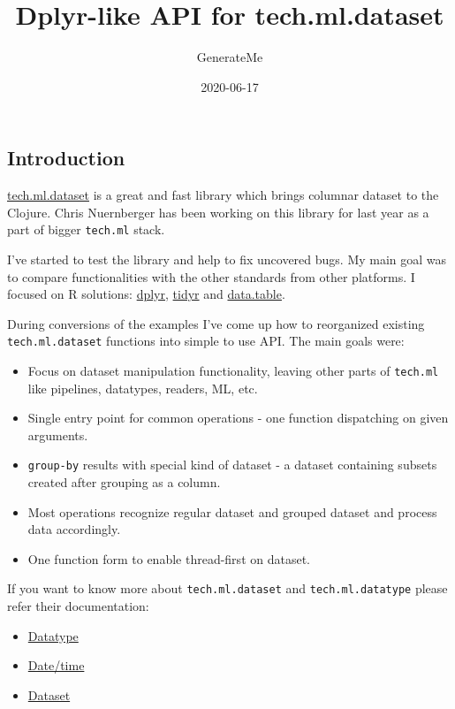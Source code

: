 \documentclass[]{article}
\title{Dplyr-like API for tech.ml.dataset}
\author{GenerateMe}
\date{2020-06-17}
\providecommand{\tightlist}{%
  \setlength{\itemsep}{0pt}\setlength{\parskip}{0pt}}
\begin{document}
\maketitle

\subsection{Introduction}\label{introduction}

\href{https://github.com/techascent/tech.ml.dataset}{tech.ml.dataset} is
a great and fast library which brings columnar dataset to the Clojure.
Chris Nuernberger has been working on this library for last year as a
part of bigger \texttt{tech.ml} stack.

I've started to test the library and help to fix uncovered bugs. My main
goal was to compare functionalities with the other standards from other
platforms. I focused on R solutions:
\href{https://dplyr.tidyverse.org/}{dplyr},
\href{https://tidyr.tidyverse.org/}{tidyr} and
\href{https://rdatatable.gitlab.io/data.table/}{data.table}.

During conversions of the examples I've come up how to reorganized
existing \texttt{tech.ml.dataset} functions into simple to use API. The
main goals were:

\begin{itemize}
\tightlist
\item
  Focus on dataset manipulation functionality, leaving other parts of
  \texttt{tech.ml} like pipelines, datatypes, readers, ML, etc.
\item
  Single entry point for common operations - one function dispatching on
  given arguments.
\item
  \texttt{group-by} results with special kind of dataset - a dataset
  containing subsets created after grouping as a column.
\item
  Most operations recognize regular dataset and grouped dataset and
  process data accordingly.
\item
  One function form to enable thread-first on dataset.
\end{itemize}

If you want to know more about \texttt{tech.ml.dataset} and
\texttt{tech.ml.datatype} please refer their documentation:

\begin{itemize}
\tightlist
\item
  \href{https://github.com/techascent/tech.datatype/blob/master/docs/cheatsheet.md}{Datatype}
\item
  \href{https://github.com/techascent/tech.datatype/blob/master/docs/datetime.md}{Date/time}
\item
  \href{https://github.com/techascent/tech.ml.dataset/blob/master/docs/walkthrough.md}{Dataset}
\end{itemize}
\end{document}
